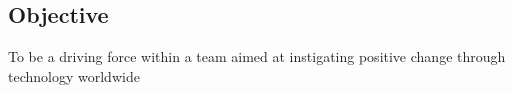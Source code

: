 \documentclass[margin,line]{resume}
\begin{document}
\address{1109 Woodleaf Drive\\O'Fallon\\IL 62269 $\bullet$ (618) 530-0659 $\bullet$ jesse.j.cook@member.fsf.org}
\begin{resume}
\section{Objective}
To be a driving force within a team aimed at instigating positive change through technology worldwide




\end{resume}
\end{document}
